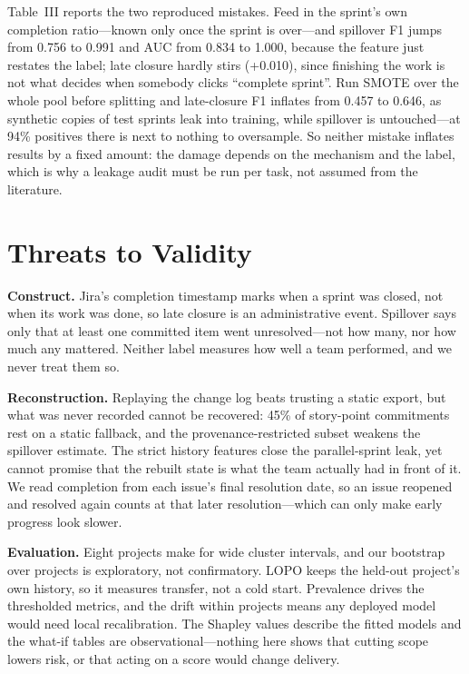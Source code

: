 \documentclass[conference]{IEEEtran}
\begin{document}
Table~III reports the two reproduced mistakes. Feed in the sprint's own completion ratio---known only once the sprint is over---and spillover F1 jumps from 0.756 to 0.991 and AUC from 0.834 to 1.000, because the feature just restates the label; late closure hardly stirs (+0.010), since finishing the work is not what decides when somebody clicks ``complete sprint''. Run SMOTE over the whole pool before splitting and late-closure F1 inflates from 0.457 to 0.646, as synthetic copies of test sprints leak into training, while spillover is untouched---at 94\% positives there is next to nothing to oversample. So neither mistake inflates results by a fixed amount: the damage depends on the mechanism and the label, which is why a leakage audit must be run per task, not assumed from the literature.

\section{Threats to Validity}

\textbf{Construct.} Jira's completion timestamp marks when a sprint was closed, not when its work was done, so late closure is an administrative event. Spillover says only that at least one committed item went unresolved---not how many, nor how much any mattered. Neither label measures how well a team performed, and we never treat them so.

\textbf{Reconstruction.} Replaying the change log beats trusting a static export, but what was never recorded cannot be recovered: 45\% of story-point commitments rest on a static fallback, and the provenance-restricted subset weakens the spillover estimate. The strict history features close the parallel-sprint leak, yet cannot promise that the rebuilt state is what the team actually had in front of it. We read completion from each issue's final resolution date, so an issue reopened and resolved again counts at that later resolution---which can only make early progress look slower.

\textbf{Evaluation.} Eight projects make for wide cluster intervals, and our bootstrap over projects is exploratory, not confirmatory. LOPO keeps the held-out project's own history, so it measures transfer, not a cold start. Prevalence drives the thresholded metrics, and the drift within projects means any deployed model would need local recalibration. The Shapley values describe the fitted models and the what-if tables are observational---nothing here shows that cutting scope lowers risk, or that acting on a score would change delivery.
\end{document}
